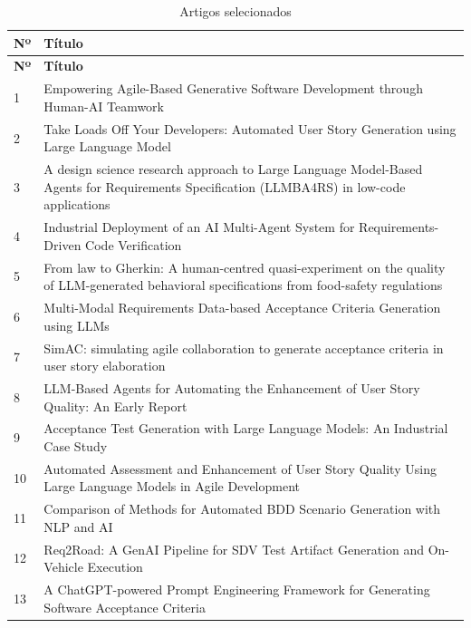 \begin{small}\begin{SingleSpacing}
\begin{longtable}{|p{}|p{}|}
  \caption{Artigos selecionados}
  \label{tab:artigos} \\
  \hline
  \textbf{Nº} & \textbf{Título} \\ \hline
  \endfirsthead
  \hline
  \textbf{Nº} & \textbf{Título} \\ \hline
  \endhead
  1 & Empowering Agile-Based Generative Software Development through Human-AI Teamwork \cite{zhang2025} \\ \hline
  2 & Take Loads Off Your Developers: Automated User Story Generation using Large Language Model \cite{rahman2024} \\ \hline
  3 & A design science research approach to Large Language Model-Based Agents for Requirements Specification (LLMBA4RS) in low-code applications \cite{rotar2025} \\ \hline
  4 & Industrial Deployment of an AI Multi-Agent System for Requirements-Driven Code Verification \cite{baker2026} \\ \hline
  5 & From law to Gherkin: A human-centred quasi-experiment on the quality of LLM-generated behavioral specifications from food-safety regulations \cite{hassani2026} \\ \hline
  6 & Multi-Modal Requirements Data-based Acceptance Criteria Generation using LLMs \cite{wang2025} \\ \hline
  7 & SimAC: simulating agile collaboration to generate acceptance criteria in user story elaboration \cite{li2024} \\ \hline
  8 & LLM-Based Agents for Automating the Enhancement of User Story Quality: An Early Report \cite{zhang2024} \\ \hline
  9 & Acceptance Test Generation with Large Language Models: An Industrial Case Study \cite{ferreira2025} \\ \hline
  10 & Automated Assessment and Enhancement of User Story Quality Using Large Language Models in Agile Development \cite{lotfi2025} \\ \hline
  11 & Comparison of Methods for Automated BDD Scenario Generation with NLP and AI \cite{matveeva2025} \\ \hline
  12 & Req2Road: A GenAI Pipeline for SDV Test Artifact Generation and On-Vehicle Execution \cite{zyberaj2026} \\ \hline
  13 & A ChatGPT-powered Prompt Engineering Framework for Generating Software Acceptance Criteria \cite{rawson2025framework} \\ \hline

\end{longtable}
\end{SingleSpacing}
\end{small}
